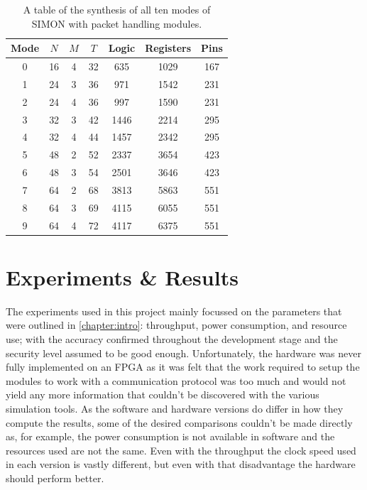 \documentclass[12pt,twoside,a4paper]{report}
\begin{document}
	\begin{table}[H]
	\centering
	\begin{tabular}{||c|c|c|c|c|c|c||}
		\hline \hline
		Mode  & $N$ & $M$ & $T$ & Logic & Registers & Pins\\
		\hline \hline
		0 & 16 & 4 & 32 & 635 & 1029 & 167 \\
		\hline
		1 & 24 & 3 & 36 & 971	& 1542 & 231  \\
		2 & 24 & 4 & 36 & 997 &	1590 & 231  \\
		\hline
		3 & 32 & 3 & 42 & 1446 & 2214 &	295  \\
		4 & 32 & 4 & 44 & 1457 & 2342 &	295	\\
		\hline
		5 & 48 & 2 & 52 & 2337 & 3654 &	423  \\
		6 & 48 & 3 & 54 & 2501 & 3646 & 423 \\
		\hline
		7 & 64 & 2 & 68 & 3813 & 5863 & 551  \\
		8 & 64 & 3 & 69 & 4115 & 6055 & 551 \\
 		9 & 64 & 4 & 72 & 4117 & 6375 &	551 \\
		\hline \hline
	\end{tabular}
	\caption{A table of the synthesis of all ten modes of SIMON with packet handling modules.}
	\label{table:synth3}
	\end{table}

	\chapter{Experiments \& Results}
	\label{chapter:RESULT}
	
	The experiments used in this project mainly focussed on the parameters that were outlined in \autoref{chapter:intro}: throughput, power consumption, and resource use; with the accuracy confirmed throughout the development stage and the security level assumed to be good enough. Unfortunately, the hardware was never fully implemented on an FPGA as it was felt that the work required to setup the modules to work with a communication protocol was too much and would not yield any more information that couldn't be discovered  with the various simulation tools. As the software and hardware versions do differ in how they compute the results, some of the desired comparisons couldn't be made directly as, for example, the power consumption is not available in software and the resources used are not the same. Even with the throughput the clock speed used in each version is vastly different, but even with that disadvantage the hardware should perform better.
	
\end{document}
